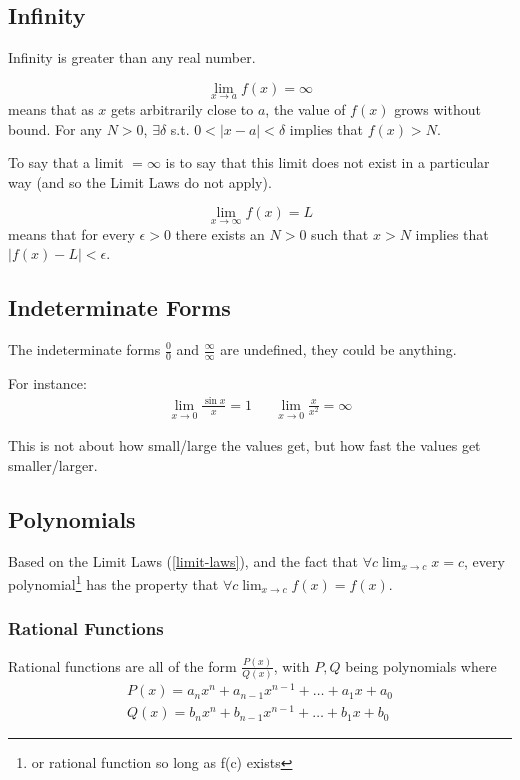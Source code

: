 \documentclass{article}
\begin{document}
\subsection{Infinity}
Infinity is greater than any real number.

$$\lim_{x\to a}f(x) = \infty$$ means that as $x$ gets arbitrarily close to $a$, the value of $f(x)$ grows without bound. For any $N>0$, $\exists\delta$ s.t. $0 < |x-a| < \delta$ implies that $f(x) > N$.

To say that a limit $= \infty$ is to say that this limit does not exist in a particular way (and so the Limit Laws do not apply).

$$\lim_{x\to\infty}f(x) = L$$ means that for every $\epsilon > 0$ there exists an $N > 0$ such that $x>N$ implies that $|f(x)-L|<\epsilon$.

\subsection{Indeterminate Forms}
The indeterminate forms $\frac{0}{0}$ and $\frac{\infty}{\infty}$ are undefined, they could be anything.

For instance:
\begin{align*}
\lim_{x\to 0} \frac{\sin{x}}{x} = 1 & & \lim_{x\to 0}\frac{x}{x^2} = \infty
\end{align*}

This is not about how small/large the values get, but how fast the values get smaller/larger.

\subsection{Polynomials}
Based on the Limit Laws (\ref{limit-laws}), and the fact that $\forall c \lim_{x\to c}\limits x = c$, every polynomial\footnote{or rational function so long as f(c) exists} has the property that $\forall c \lim_{x\to c}\limits f(x)  = f(x)$.

\subsubsection{Rational Functions}
Rational functions are all of the form $\frac{P(x)}{Q(x)}$, with $P, Q$ being polynomials where
\begin{align*}
    P(x) = a_nx^n + a_{n-1}x^{n-1} + \ldots + a_1x + a_0 \\
    Q(x) = b_nx^n + b_{n-1}x^{n-1} + \ldots + b_1x + b_0
\end{align*}
\end{document}
